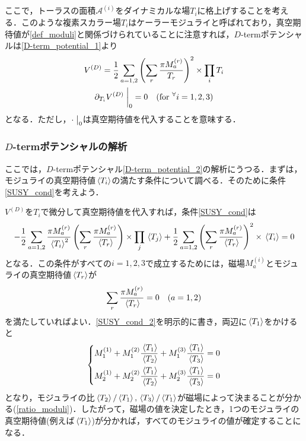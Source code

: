 \documentclass[a4paper,uplatex,dvipdfmx]{jsarticle}
\theoremstyle{definition}
\begin{document}
ここで，トーラスの面積$\mathcal{A}^{(i)}$をダイナミカルな場$T_{i}$に格上げすることを考える．このような複素スカラー場$T_{i}$はケーラーモジュライと呼ばれており，真空期待値が\eqref{def_moduli}と関係づけられていることに注意すれば，$D$-termポテンシャルは\eqref{D-term_potential_1}より
\begin{gather}
   V^{(D)}
   =
   \frac{1}{2}
   \sum_{a=1,2}
   \left(  
      \sum_{r}\frac{\pi M_{a}^{(r)}}{T_{r}}
   \right)^2
   \times
   \prod_{i}T_{i}
   \label{D-term_potential_2}
   \\
   \partial_{T_{i}}V^{(D)}
   \left.\vphantom{\frac{1}{2}}\right|_{0}
   =
   0
   \quad
   (\text{for}\ ^{\forall}i=1,2,3)
   \label{SUSY_cond}
\end{gather}
となる．ただし，$\cdot\left.\vphantom{\frac{1}{2}}\right|_{0}$は真空期待値を代入することを意味する．


\subsubsection{\texorpdfstring{$D$}{D}-termポテンシャルの解析}
\label{D-term_potential_analysis}

ここでは，$D$-termポテンシャル\eqref{D-term_potential_2}の解析にうつる．まずは，モジュライの真空期待値$\ev*{T_{i}}$の満たす条件について調べる．そのために条件\eqref{SUSY_cond}を考えよう．

$V^{(D)}$を$T_{i}$で微分して真空期待値を代入すれば，条件\eqref{SUSY_cond}は
\begin{equation}
   -
   \frac{1}{2}\sum_{a=1,2}
   \frac{\pi M_{a}^{(r)}}{\ev*{T_{i}}^{2}}
   \left(  
      \sum_{r}\frac{\pi M_{a}^{(r)}}{\ev*{T_{r}}}
   \right)
   \times
   \prod_{j}
   \ev*{T_{j}}
   +
   \frac{1}{2}
   \sum_{a=1,2}
   \left(  
      \sum_{r}\frac{\pi M_{a}^{(r)}}{\ev*{T_{r}}}
   \right)^2
   \times
   \ev*{T_{i}}
   =
   0
   \nonumber
\end{equation}
となる．この条件がすべての$i=1,2,3$で成立するためには，磁場$M_{a}^{(i)}$とモジュライの真空期待値$\ev*{T_{r}}$が
\begin{equation}
   \sum_{r}\frac{\pi M_{a}^{(r)}}{\ev*{T_{r}}}
   =
   0
   \quad
   (a=1,2)   
   \label{SUSY_cond_2}
\end{equation}
を満たしていればよい．\eqref{SUSY_cond_2}を明示的に書き，両辺に$\ev*{T_{1}}$をかけると
\begin{equation}
   \left\{
      \begin{alignedat}{1}
         M_{1}^{(1)}
         +
         M_{1}^{(2)}\frac{\ev*{T_{1}}}{\ev*{T_{2}}}
         +
         M_{1}^{(3)}\frac{\ev*{T_{1}}}{\ev*{T_{3}}}
         &=
         0
         \\
         M_{2}^{(1)}
         +
         M_{2}^{(2)}\frac{\ev*{T_{1}}}{\ev*{T_{2}}}
         +
         M_{2}^{(3)}\frac{\ev*{T_{1}}}{\ev*{T_{3}}}
         &=
         0
      \end{alignedat}
   \right.
   \nonumber
\end{equation}
となり，モジュライの比$\ev*{T_{2}}/\ev*{T_{1}},\ev*{T_{3}}/\ev*{T_{1}}$が磁場によって決まることが分かる(\ref{ratio_moduli})．したがって，磁場の値を決定したとき，1つのモジュライの真空期待値(例えば$\ev*{T_{1}}$)が分かれば，すべてのモジュライの値が確定することになる．
\end{document}
